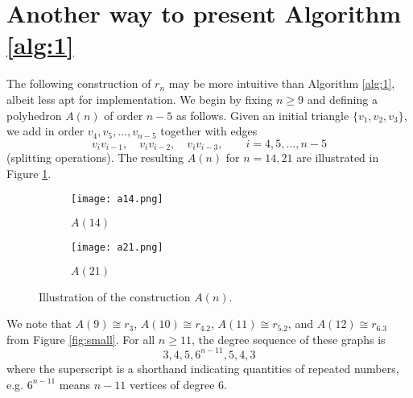 \documentclass[11pt]{article}
\newlength{\numtwo}
\theoremstyle{definition}
\numberwithin{equation}{section}
\begin{document}
\section{Another way to present Algorithm \ref{alg:1}}
\label{appa}
The following construction of $r_n$ may be more intuitive than Algorithm \ref{alg:1}, albeit less apt for implementation. We begin by fixing $n\geq 9$ and defining a polyhedron $A(n)$ of order $n-5$ as follows. Given an initial triangle $\{v_1,v_2,v_3\}$, we add in order $v_4,v_5,\dots,v_{n-5}$ together with edges
\[v_iv_{i-1}, \quad v_iv_{i-2}, \quad v_iv_{i-3}, \qquad i=4,5,\dots,n-5\]
(splitting operations). %
The resulting $A(n)$ for $n=14, 21$ are illustrated in Figure \ref{fig:14,21}.

\begin{figure}[h!]
	\centering
	\begin{subfigure}{\numtwo}
		\centering
		\texttt{[image: a14.png]}
		\caption{$A(14)$}
	\end{subfigure}
	\hspace{1.75cm}
	\begin{subfigure}{\numtwo}
		\centering
		\texttt{[image: a21.png]}
		\caption{$A(21)$}
	\end{subfigure}
	\caption{Illustration of the construction $A(n)$.}
	\label{fig:14,21}
\end{figure}

We note that $A(9)\cong r_3$, $A(10)\cong r_{4.2}$, $A(11)\cong r_{5.2}$, and $A(12)\cong r_{6.3}$ from Figure \ref{fig:small}. For all $n\geq 11$, the degree sequence of these graphs is
\[3,4,5,6^{n-11},5,4,3\]
where the superscript is a shorthand indicating quantities of repeated numbers, e.g. $6^{n-11}$ means $n-11$ vertices of degree $6$.
\end{document}
